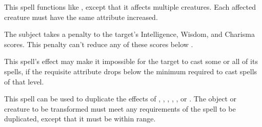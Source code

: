 \begin{spelleffect}
    This spell functions like , except that it affects multiple creatures. Each affected creature must have the same attribute increased. 
\end{spelleffect}

\spelldur{\durshort}
\begin{spelleffect}
    The subject takes a  penalty to the target's Intelligence, Wisdom, and Charisma scores. This penalty can't reduce any of these scores below .
\end{spelleffect}
\begin{spellnotes}
    This spell's effect may make it impossible for the target to cast some or all of its spells, if the requisite attribute drops below the minimum required to cast spells of that level.
\end{spellnotes}

\begin{spelleffect}
    This spell can be used to duplicate the effects of , , , , , or . The object or creature to be transformed must meet any requirements of the spell to be duplicated, except that it must be within \rngmed range.
\end{spelleffect}

